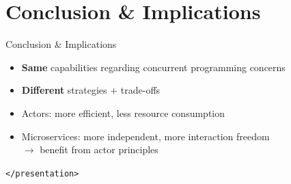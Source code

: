 \documentclass{beamer}
\begin{document}

\section{Conclusion \& Implications}


\begin{frame}{Conclusion \& Implications}

\begin{itemize}
  \item \textbf{Same} capabilities regarding concurrent programming concerns
  \item \textbf{Different} strategies $+$ trade-offs
  \item Actors: more efficient, less resource consumption
  \item Microservices: more independent, more interaction freedom \\%
        $\rightarrow$ benefit from actor principles 
\end{itemize}

\end{frame}


\begin{frame}{}

\vspace{1cm}
\begin{center}
  \texttt{</presentation>}
\end{center}

\end{frame}

\end{document}
